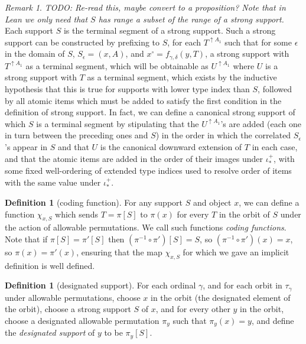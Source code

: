 \documentclass[112pt]{article}
\theoremstyle{definition}
\newtheorem{definition}[theorem]{Definition}
\theoremstyle{remark}
\newtheorem{remark}[theorem]{Remark}
\newcommand{\rk}[1]{{\color{blue}\sl #1}}
\begin{document}
\begin{remark}
\rk{TODO: Re-read this, maybe convert to a proposition? Note that in Lean we only need that $S$ has range a subset of the range of a strong support.}
Each support $S$ is the terminal segment of a strong support.  Such a strong support can be constructed by prefixing to $S$, for each $T^{\uparrow A_1}$ such that for some $\epsilon$ in the domain of $S$, $S_\epsilon = (x,A)$, and $x^\circ = f_{\gamma,\delta}(y,T)$, a strong support with $T^{\uparrow A_1}$ as a terminal segment, which will be obtainable as $U^{\uparrow A_1}$ where $U$ is a strong support with $T$ as a terminal segment, which exists by the inductive hypothesis that this is true for supports with lower type index than $S$, followed by all atomic items which must be added to satisfy the first condition in the definition of strong support.   In fact, we can define a canonical strong support of which $S$ is a terminal segment by stipulating that the $U^{\uparrow A_1}$'s are added (each one in turn between the preceding ones and $S$)  in the order in which the correlated
$S_\epsilon$'s appear in $S$ and that $U$ is the canonical downward extension of $T$ in each case, and that the atomic items are added in the order of their images under $\iota^+_*$, with some fixed well-ordering of extended type indices used to resolve order of items with the same value under $\iota^+_*$.
\end{remark}

\begin{definition}[coding function]\label{def:coding_function}
For any support $S$ and object $x$, we can define a function $\chi_{x,S}$ which sends $T=\pi[S]$ to $\pi(x)$ for every $T$ in the orbit of $S$ under
the action of allowable permutations.  We call such functions {\em coding functions\/}.  Note that if $\pi[S]=\pi'[S]$ then $(\pi^{-1}\circ \pi')[S]= S$, so
$(\pi^{-1}\circ \pi')(x)= x$, so $\pi(x)=\pi'(x)$, ensuring that the map $\chi_{x,S}$ for which we gave an implicit definition is well defined.
\end{definition}

\begin{definition}[designated support]
For each ordinal $\gamma$, and for each orbit in $\tau_\gamma$ under allowable permutations, choose $x$ in the orbit (the designated element of the orbit), choose a strong support $S$ of $x$,
{and for every other $y$ in the orbit, choose a designated allowable permutation $\pi_y$ such that $\pi_y(x) = y$, and define the {\em designated support\/} of $y$ to be $\pi_y[S]$.}
\end{definition}
\end{document}
